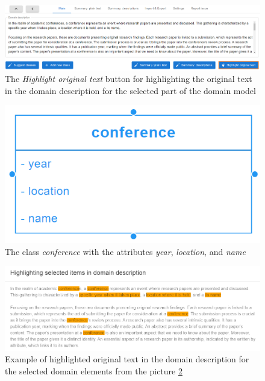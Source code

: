 \begin{figure}[!h]
    \includegraphics[scale=0.29]{../docs/images/frontend/highlight-original-text-button.png}
    \caption{\centering The \textit{Highlight original text} button for highlighting the original text in the domain description for the selected part of the domain model}
    \label{fig:highlight_original_text_button}
\end{figure}


\begin{figure}[!h]
    \includegraphics[scale=0.31]{../docs/images/frontend/class-example.png}
    \caption{\centering The class \textit{conference} with the attributes \textit{year}, \textit{location}, and \textit{name}}
    \label{fig:class_example}
\end{figure}


\begin{figure}[!h]
    \includegraphics[scale=0.56]{../docs/images/frontend/highlight-all-example.png}
    \caption{\centering Example of highlighted original text in the domain description for the selected domain elements from the picture \ref{fig:class_example}}
    \label{fig:highlight_all_example}
\end{figure}


